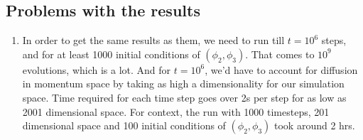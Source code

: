 \documentclass[12pt]{article}
\begin{document}
\subsection{Problems with the results}
\begin{enumerate}
    \item In order to get the same results as them, we need to run till $t = 10^6$ steps,
    and for at least 1000 initial conditions of $(\phi_2, \phi_3)$. That comes to $10^9$ evolutions,
    which is a lot. And for $t = 10^6$, we'd have to account for diffusion in momentum space by
    taking as high a dimensionality for our simulation space. Time required for each time step goes
    over 2s per step for as low as 2001 dimensional space. For context, the run with 1000 timesteps,
    201 dimensional space and 100 initial conditions of $(\phi_2,\phi_3)$ took around 2 hrs.
\end{enumerate}

\nocite{*}
\printbibliography
\end{document}
